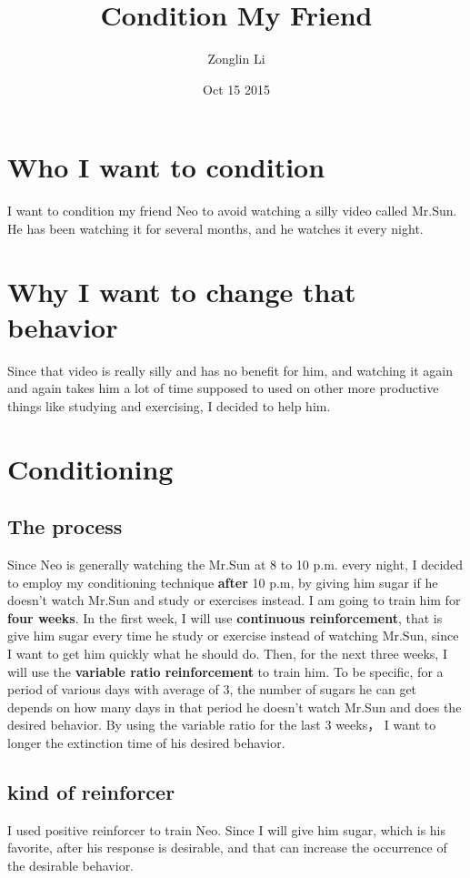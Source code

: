 \documentclass{article}
\title{Condition My Friend}
\date{Oct 15 2015}
\author{Zonglin Li}
\begin{document}
\maketitle

\section{Who I want to condition}
I want to condition my friend Neo to avoid watching a silly
video called Mr.Sun. He has been watching it for several months, and he watches
it every night.

\section{Why I want to change that behavior}
Since that video is really silly and has no benefit for him, and watching it
again and again takes him a lot of time supposed to used on other more
productive things like studying and exercising, I decided to help him.
	
\section{Conditioning}

	\subsection{The process}
	Since Neo is generally watching the Mr.Sun at 8 to 10 p.m. every night, I
	decided to employ my conditioning technique \textbf{after} 10 p.m, by giving
	him sugar if he doesn't watch Mr.Sun and study or exercises instead. I am going
	to train him for \textbf{four weeks}. In the first week, I will use
	\textbf{continuous reinforcement}, that is give him sugar every time he
	study or exercise instead of watching Mr.Sun, since I want to get him quickly
	what he should do. Then, for the next three weeks, I will use the
	\textbf{variable ratio reinforcement} to train him. To be specific, for a
	period of various days with average of 3, the number of sugars he can get
	depends on how many days in that period he doesn't watch Mr.Sun and does the
	desired behavior. By using the variable ratio for the last 3 weeks， I want to
	longer the extinction time of his desired behavior.
	
	\subsection{kind of reinforcer}
	I used positive reinforcer to train Neo. Since I will give him sugar, which is
	his favorite, after his response is desirable, and that can increase the
	occurrence of the desirable behavior. 
	
\end{document}
